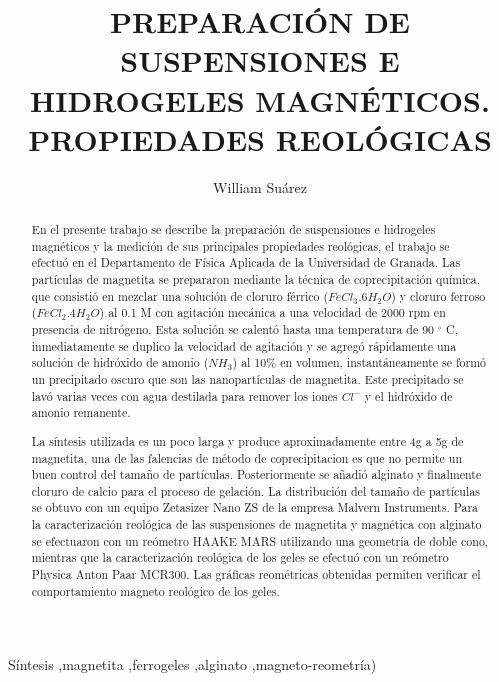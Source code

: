 \documentclass[review]{elsarticle}
\begin{document}
\begin{frontmatter}
\title{PREPARACI\'ON DE SUSPENSIONES E HIDROGELES MAGN\'ETICOS. PROPIEDADES REOL\'OGICAS}


\author[a]{William Su\'arez}
\address[a]{Afiliaci\'on X1.}



\begin{abstract}
En el presente trabajo se describe la preparaci\'on de suspensiones e hidrogeles magn\'eticos y la medici\'on de sus principales propiedades reol\'ogicas, el trabajo se efectu\'o en el Departamento de F\'isica Aplicada de la Universidad de Granada. Las part\'iculas de magnetita se prepararon mediante la t\'ecnica de coprecipitaci\'on qu\'imica, que consisti\'o en mezclar una soluci\'on de cloruro f\'errico ($Fe Cl_{3} .6 H_{2}O$) y cloruro ferroso ($Fe Cl_{2} .4 H_{2}O$) al 0.1 M con agitaci\'on mec\'anica a una velocidad de 2000 rpm en presencia de nitr\'ogeno. Esta soluci\'on se calent\'o hasta una temperatura de 90 {\ensuremath{{}^\circ}} C, inmediatamente se duplico la velocidad de agitaci\'on y se agreg\'o r\'apidamente una soluci\'on de hidr\'oxido de amonio ($NH_3$) al 10\% en volumen, instant\'aneamente se form\'o un precipitado oscuro que son las nanopart\'iculas de magnetita.
Este precipitado se lav\'o varias veces con agua destilada para remover los iones $C l^{ -}$ y el hidr\'oxido de amonio remanente.

La s\'intesis utilizada es un poco larga y produce aproximadamente entre 4g a 5g de magnetita, una de las falencias de m\'etodo de coprecipitacion es que no permite un buen control del tama\~no de part\'iculas. Posteriormente se a\~nadi\'o alginato y finalmente cloruro de calcio para el proceso de gelaci\'on. La distribuci\'on del tama\~no de part\'iculas se obtuvo con un equipo Zetasizer Nano ZS de la empresa Malvern Instruments. Para la caracterizaci\'on reol\'ogica de las suspensiones de magnetita y magn\'etica con alginato se efectuaron con un re\'ometro HAAKE MARS utilizando una geometr\'ia de doble cono, mientras que la caracterizaci\'on reol\'ogica de los geles se efectu\'o con un re\'ometro Physica Anton Paar MCR300. Las gr\'aficas reom\'etricas obtenidas permiten verificar
el comportamiento magneto reol\'ogico de los geles.

\end{abstract}

\begin{keyword}
S\'intesis \sep magnetita \sep ferrogeles \sep alginato \sep magneto-reometr\'ia)
\end{keyword}

\end{frontmatter}
\end{document}
